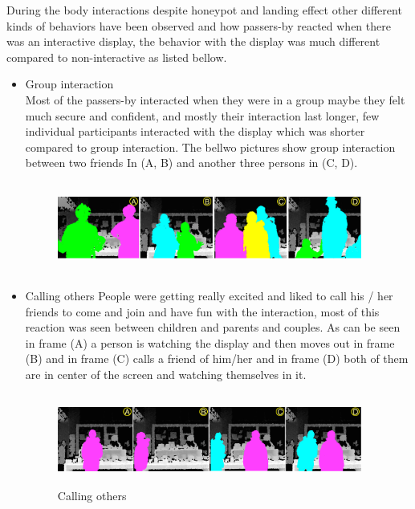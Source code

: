 \begin{enumerate}
During the body interactions despite honeypot and landing effect other different kinds of behaviors have been observed and how passers-by reacted when there was an interactive display, the behavior with the display was much different compared to non-interactive as listed bellow.

\begin{itemize}
\item Group interaction \\
Most of the passers-by interacted when they were in a group maybe they felt much secure and confident, and mostly their interaction last longer, few individual participants interacted with the display which was shorter compared to group interaction. The bellwo pictures show group interaction between two friends In (A, B) and another three persons in (C, D). 

\begin{figure}[H]
    \centering
    \includegraphics[width=100mm,height=30mm]{Figures/8/body_inter_findings/effects/group}
    \caption{}
    \label{fig:group_interaction}
\end{figure}


\item Calling others
People were getting really excited and liked to call his / her friends to come and join and have fun with the interaction, most of this reaction was seen between children and parents and couples. As can be seen in frame (A) a person is watching the display and then moves out in frame (B) and in frame (C) calls a friend of him/her and in frame (D) both of them are in center of the screen and watching themselves in it.


\begin{figure}[H]
    \centering
    \includegraphics[width=100mm,height=30mm]{Figures/8/body_inter_findings/effects/calling_others}
    \caption{Calling others}
    \label{fig:calling_interaction}
\end{figure}



\end{itemize}
\end{enumerate}
